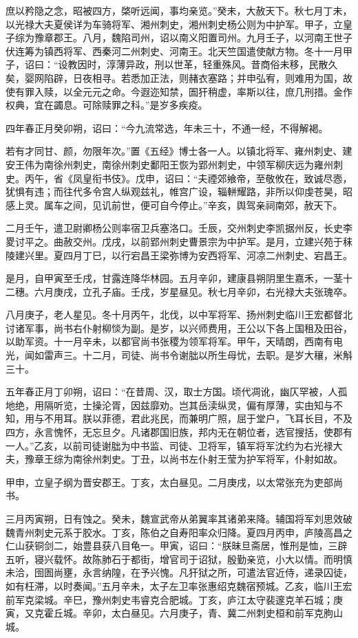 \documentclass[12pt,UTF8]{ctexbook}
\begin{document}
庶以矜隐之念，昭被四方，棨听远闻，事均亲览。”癸未，大赦天下。秋七月丁未，以光禄大夫夏侯详为车骑将军、湘州刺史，湘州刺史杨公则为中护军。甲子，立皇子综为豫章郡王。八月，魏陷司州，诏以南义阳置司州。九月壬子，以河南王世子伏连筹为镇西将军、西秦河二州刺史、河南王。北天竺国遣使献方物。冬十一月甲子，诏曰：“设教因时，淳薄异政，刑以世革，轻重殊风。昔商俗未移，民散久矣，婴网陷辟，日夜相寻。若悉加正法，则赭衣塞路；并申弘宥，则难用为国，故使有罪入赎，以全元元之命。今遐迩知禁，圄犴稍虚，率斯以往，庶几刑措。金作权典，宜在蠲息。可除赎罪之科。”是岁多疾疫。

四年春正月癸卯朔，诏曰：“今九流常选，年未三十，不通一经，不得解褐。

若有才同甘、颜，勿限年次。”置《五经》博士各一人。以镇北将军、雍州刺史、建安王伟为南徐州刺史，南徐州刺史鄱阳王恢为郢州刺史，中领军柳庆远为雍州刺史。丙午，省《凤皇衔书伎》。戊申，诏曰：“夫禋郊飨帝，至敬攸在，致诚尽悫，犹惧有违；而往代多令宫人纵观兹礼，帷宫广设，辎軿耀路，非所以仰虔苍昊，昭感上灵。属车之间，见讥前世，便可自今停止。”辛亥，舆驾亲祠南郊，赦天下。

二月壬午，遣卫尉卿杨公则率宿卫兵塞洛口。壬辰，交州刺史李凯据州反，长史李畟讨平之。曲赦交州。戊戌，以前郢州刺史曹景宗为中护军。是月，立建兴苑于秣陵建兴里。夏四月丁巳，以行宕昌王梁弥博为安西将军、河凉二州刺史、宕昌王。

是月，自甲寅至壬戌，甘露连降华林园。五月辛卯，建康县朔阴里生嘉禾，一茎十二穗。六月庚戌，立孔子庙。壬戌，岁星昼见。秋七月辛卯，右光禄大夫张瑰卒。

八月庚子，老人星见。冬十月丙午，北伐，以中军将军、扬州刺史临川王宏都督北讨诸军事，尚书右仆射柳惔为副。是岁，以兴师费用，王公以下各上国租及田谷，以助军资。十一月辛未，以都官尚书张稷为领军将军。甲午，天晴朗，西南有电光，闻如雷声三。十二月，司徒、尚书令谢朏以所生母忧，去职。是岁大穰，米斛三十。

五年春正月丁卯朔，诏曰：“在昔周、汉，取士方国。顷代凋讹，幽仄罕被，人孤地绝，用隔听览，士操沦胥，因兹靡劝。岂其岳渎纵灵，偏有厚薄，实由知与不知，用与不用耳。朕以菲德，君此兆民，而兼明广照，屈于堂户，飞耳长目，不及四方，永言愧怀，无忘旦夕。凡诸郡国旧族，邦内无在朝位者，选官搜括，使郡有一人。”乙亥，以前司徒谢朏为中书监、司徒、卫将军，镇军将军沈约为右光禄大夫，豫章王综为南徐州刺史。丁丑，以尚书左仆射王莹为护军将军，仆射如故。

甲申，立皇子纲为晋安郡王。丁亥，太白昼见。二月庚戌，以太常张充为吏部尚书。

三月丙寅朔，日有蚀之。癸未，魏宣武帝从弟翼率其诸弟来降。辅国将军刘思效破魏青州刺史元系于胶水。丁亥，陈伯之自寿阳率众归降。夏四月丙申，庐陵高昌之仁山获铜剑二，始豊县获八目龟一。甲寅，诏曰：“朕昧旦斋居，惟刑是恤，三辟五听，寝兴载怀。故陈肺石于都街，增官司于诏狱，殷勤亲览，小大以情。而明慎未洽，囹圄尚壅，永言纳隍，在予兴愧。凡犴狱之所，可遣法官近侍，递录囚徒，如有枉滞，以时奏闻。”五月辛未，太子左卫率张惠绍克魏宿预城。乙亥，临川王宏前军克梁城。辛巳，豫州刺史韦睿克合肥城。丁亥，庐江太守裴邃克羊石城；庚寅，又克霍丘城。辛卯，太白昼见。六月庚子，青、冀二州刺史桓和前军克朐山城。
\end{document}
